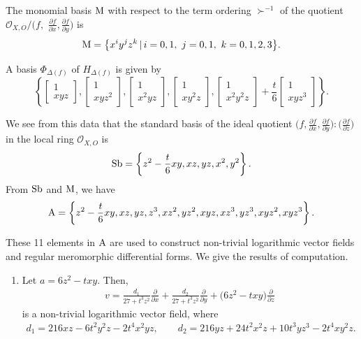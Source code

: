 \documentclass[10pt,a4paper]{amsart}
\numberwithin{equation}{section}
\begin{document}
\begin{Example}
The monomial basis ${\rm M} $ with respect to the term ordering $\succ^{-1}$ of the quotient
${\mathcal O}_{X,O}/\big(f,$ $\frac{\partial f}{\partial x}, \frac{\partial f}{\partial y}\big)$ is
\begin{gather*}
{\rm M} = \big\{ x^i y^j z^k \,|\, i=0,1, \ j=0,1, \ k=0,1,2,3 \big\}.
\end{gather*}

A basis $ \Phi_{\Delta(f)} $ of $ H_{\Delta(f)} $ is given by
\[
\left\{
\begin{bmatrix} 1 \\ x y z \end{bmatrix},
\begin{bmatrix} 1 \\ x y z^{2}\end{bmatrix},
\begin{bmatrix} 1 \\ x^2 y z \end{bmatrix},
\begin{bmatrix} 1 \\ x y^2 z\end{bmatrix},
\begin{bmatrix} 1 \\ x^{2} y^{2} z\end{bmatrix}+ \dfrac{t}{6}
\begin{bmatrix} 1 \\ x y z^{3}\end{bmatrix} \right\}.
\]

We see from this data that the standard basis of the ideal quotient $\big(f, \frac{\partial f}{\partial x}, \frac{\partial f}{\partial y}\big) : \big(\frac{\partial f}{\partial z}\big)$
in the local ring ${\mathcal O}_{X,O}$ is
\begin{gather*}
{\rm Sb} = \left\{z^2-\dfrac{t}{6}xy, xz, yz, x^2, y^2\right\}.
\end{gather*}
From $ {\rm Sb} $ and $ {\rm M} $, we have
\begin{gather*}
{\rm A} =\left\{z^2-\dfrac{t}{6}xy, xz, yz, z^3, xz^2, yz^2, xyz, xz^3, yz^3, xyz^2, xyz^3\right\}.
\end{gather*}

These 11 elements in $ {\rm A} $ are used to construct non-trivial logarithmic vector fields and regular meromorphic differential forms.
We give the results of computation.
\begin{enumerate}\itemsep=0pt
\item[$(i)$] Let $ a=6z^2-txy$. Then,
\begin{gather*}
v=\frac{d_1}{27+t^3z^2}\frac{\partial}{\partial x} +\frac{d_2}{27+t^3z^2}\frac{\partial}{\partial y} +\big(6z^2-txy\big)\frac{\partial}{\partial z}
\end{gather*}
is a non-trivial logarithmic vector field, where
\begin{gather*}
d_1= 216xz-6t^2y^2z-2t^4x^2yz, \qquad
d_2=216yz+24t^2x^2z+10t^3yz^3-2t^4xy^2z.
\end{gather*}


\end{enumerate}
\end{Example}
\end{document}
